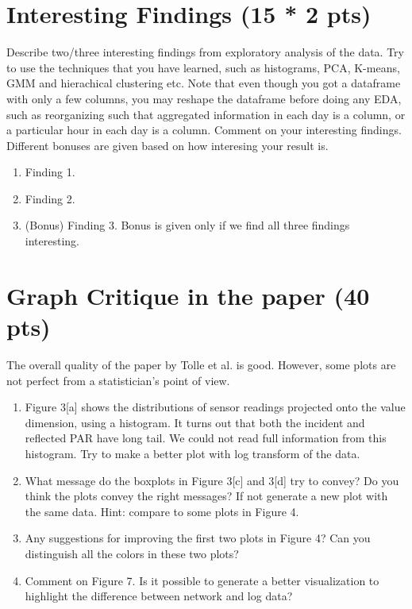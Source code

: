 \documentclass[11pt]{article}
\begin{document}
\section{Interesting Findings (15 * 2 pts)}
Describe two/three interesting findings from exploratory analysis of the data. Try to use the techniques that you have learned, such as histograms, PCA, K-means, GMM and hierachical clustering etc. Note that even though you got a dataframe with only a few columns, you may reshape the dataframe before doing any EDA, such as reorganizing such that aggregated information in each day is a column, or a particular hour in each day is a column. Comment on your interesting findings. Different bonuses are given based on how interesing your result is. 
\begin{enumerate}[label=(\alph*)]
\item Finding 1.
\item Finding 2.
\item (Bonus) Finding 3. Bonus is given only if we find all three findings interesting. 
\end{enumerate}

\section{Graph Critique in the paper (40 pts)}
The overall quality of the paper by Tolle et al. is good. However, some plots are not perfect from a statistician's point of view.
\begin{enumerate}[label=(\alph*)]
\item Figure 3[a] shows the distributions of sensor readings projected onto the value dimension, using a histogram. It turns out that both the incident and reflected PAR have long tail. We could not read full information from this histogram. Try to make a better plot with log transform of the data. 
\item What message do the boxplots in Figure 3[c] and 3[d] try to convey? Do you think the plots convey the right messages? If not generate a new plot with the same data. Hint: compare to some plots in Figure 4.
\item Any suggestions for improving the first two plots in Figure 4? Can you distinguish all the colors in these two plots?
\item Comment on Figure 7. Is it possible to generate a better visualization to highlight the difference between network and log data?
\end{enumerate}
\end{document}
